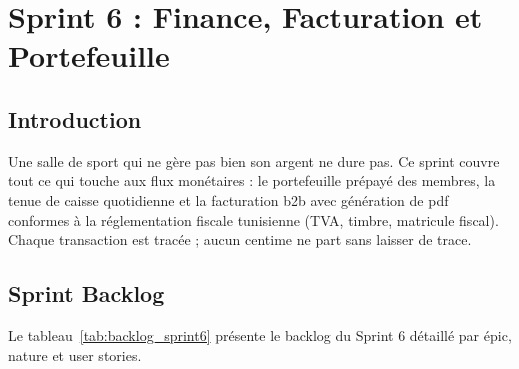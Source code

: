 ﻿\documentclass[../main.tex]{subfiles}
\begin{document}
\chapter{Sprint 6 : Finance, Facturation et Portefeuille}

\section{Introduction}

Une salle de sport qui ne g\`{e}re pas bien son argent ne dure pas. Ce sprint couvre tout ce qui touche aux flux mon\'{e}taires : le portefeuille pr\'{e}pay\'{e} des membres, la tenue de caisse quotidienne et la facturation \acrshort{b2b} avec g\'{e}n\'{e}ration de \acrshort{pdf} conformes \`{a} la r\'{e}glementation fiscale tunisienne (TVA, timbre, matricule fiscal). Chaque transaction est trac\'{e}e ; aucun centime ne part sans laisser de trace.

\section{Sprint Backlog}

Le tableau~\ref{tab:backlog_sprint6} pr\'{e}sente le backlog du Sprint 6 d\'{e}taill\'{e} par \'{e}pic, nature et user stories.
\end{document}
